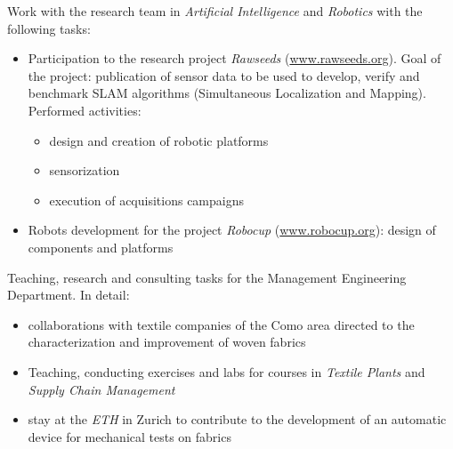 \documentclass[11pt,a4paper,sans]{moderncv} %
\begin{document}


{Work with the research team in \emph{Artificial Intelligence} and \emph{Robotics} with the following tasks:
\begin{itemize}
	\item Participation to the research project \emph{Rawseeds} (\url{www.rawseeds.org}). Goal of the project:
	 publication of sensor data to be used to develop, verify and benchmark SLAM algorithms	(Simultaneous Localization and Mapping). Performed activities:
	\begin{itemize}
		\item design and creation of robotic platforms
		\item sensorization
		\item execution of acquisitions campaigns
	\end{itemize}
	\item Robots development for the project \emph{Robocup} (\url{www.robocup.org}): design of components and platforms
\end{itemize} }



{Teaching, research and consulting tasks for the Management Engineering Department. In detail:
	\begin{itemize}
		\item collaborations with textile companies of the Como area directed to the characterization and improvement of woven fabrics
		\item Teaching, conducting exercises and labs for courses in
		\emph{Textile Plants} and \emph{Supply Chain Management}
		\item stay  at the \emph{ETH} in Zurich to contribute to the development of an automatic device for mechanical tests on fabrics
	\end{itemize}}
\end{document}
